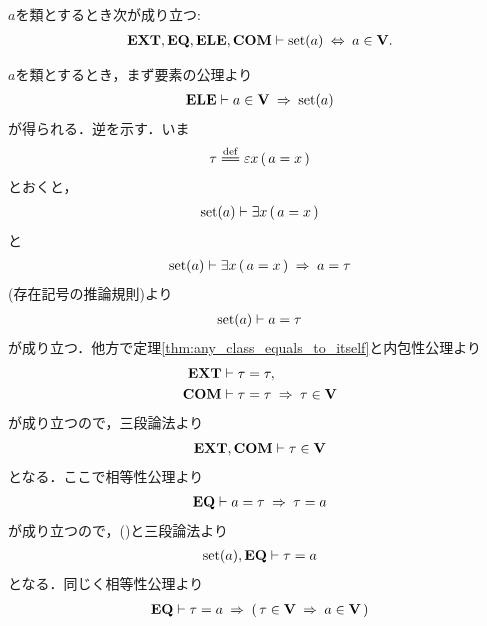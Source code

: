 	\begin{screen}
		\begin{thm}
		\label{thm:V_is_the_whole_of_sets}
			$a$を類とするとき次が成り立つ:
			\begin{align}
				\mbox{{\bf EXT}},\mbox{{\bf EQ}},\mbox{{\bf ELE}},\mbox{\bf COM} \vdash \operatorname*{set} (a) \hspace{0.25em}\Leftrightarrow\hspace{0.25em} a \in \mathbf{V}.
			\end{align}
		\end{thm}
	\end{screen}
	
	\begin{prf}
		$a$を類とするとき，まず要素の公理より
		\begin{align}
			\mbox{{\bf ELE}} \vdash a \in \mathbf{V} \hspace{0.25em}\Rightarrow\hspace{0.25em} \operatorname*{set} (a)
		\end{align}
		が得られる．逆を示す．いま
		\begin{align}
			\tau \defeq \varepsilon x\, (\, a = x\, )
		\end{align}
		とおくと，
		\begin{align}
			\operatorname*{set} (a) \vdash \exists x\, (\, a = x\, )
		\end{align}
		と
		\begin{align}
			\operatorname*{set} (a) \vdash \exists x\, (\, a = x\, ) \hspace{0.25em}\Rightarrow\hspace{0.25em} a = \tau
		\end{align}
		(存在記号の推論規則)より
		\begin{align}
			\operatorname*{set} (a) \vdash a = \tau
			\label{fom:thm_V_is_the_whole_of_sets_1}
		\end{align}
		が成り立つ．他方で定理\ref{thm:any_class_equals_to_itself}と内包性公理より
		\begin{align}
			\mbox{{\bf EXT}} &\vdash \tau = \tau, \\
			\mbox{\bf COM} &\vdash \tau = \tau \hspace{0.25em}\Rightarrow\hspace{0.25em} \tau \in \mathbf{V}
		\end{align}
		が成り立つので，三段論法より
		\begin{align}
			\mbox{{\bf EXT}},\mbox{\bf COM} \vdash \tau \in \mathbf{V}
			\label{fom:thm_V_is_the_whole_of_sets_2}
		\end{align}
		となる．ここで相等性公理より
		\begin{align}
			\mbox{{\bf EQ}} \vdash a = \tau \hspace{0.25em}\Rightarrow\hspace{0.25em} \tau = a
		\end{align}
		が成り立つので，()と三段論法より
		\begin{align}
			\operatorname*{set} (a),\mbox{{\bf EQ}} \vdash \tau = a
			\label{fom:thm_V_is_the_whole_of_sets_3}
		\end{align}
		となる．同じく相等性公理より
		\begin{align}
			\EQAX \vdash \tau = a \rarrow (\, \tau \in \Univ \rarrow a \in \Univ\, )

\end{align}
\end{prf}
